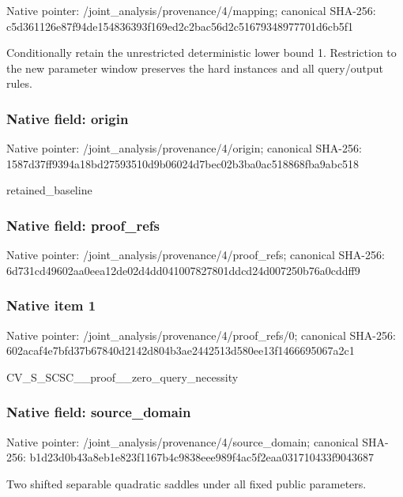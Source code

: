 \documentclass[10pt,a4paper]{article}
\begin{document}
Native pointer: /joint\_analysis/provenance/4/mapping; canonical SHA-256: c5d361126e87f94de1548363\allowbreak{}93f169ed2c2bac56d2c51679\allowbreak{}348977701d6cb5f1


Conditionally retain the unrestricted deterministic lower bound 1. Restriction to the new parameter window preserves the hard instances and all query/output rules.


\subsubsection{Native field: origin}


Native pointer: /joint\_analysis/provenance/4/origin; canonical SHA-256: 1587d37ff9394a18bd275935\allowbreak{}10d9b06024d7bec02b3ba0ac\allowbreak{}518868fba9abc518


retained\_baseline


\subsubsection{Native field: proof\_refs}


Native pointer: /joint\_analysis/provenance/4/proof\_refs; canonical SHA-256: 6d731cd49602aa0eea12de02\allowbreak{}d4dd041007827801ddcd24d0\allowbreak{}07250b76a0cddff9



\subsubsection{Native item 1}


Native pointer: /joint\_analysis/provenan\allowbreak{}ce/4/proof\_refs/0; canonical SHA-256: 602acaf4e7bfd37b67840d21\allowbreak{}42d804b3ae2442513d580ee1\allowbreak{}3f1466695067a2c1


CV\_S\_SCSC\_\_proof\_\_zero\_query\_necessity


\subsubsection{Native field: source\_domain}


Native pointer: /joint\_analysis/provenan\allowbreak{}ce/4/source\_domain; canonical SHA-256: b1d23d0b43a8eb1e823f1167\allowbreak{}b4c9838eee989f4ac5f2eaa0\allowbreak{}31710433f9043687


Two shifted separable quadratic saddles under all fixed public parameters.
\end{document}
